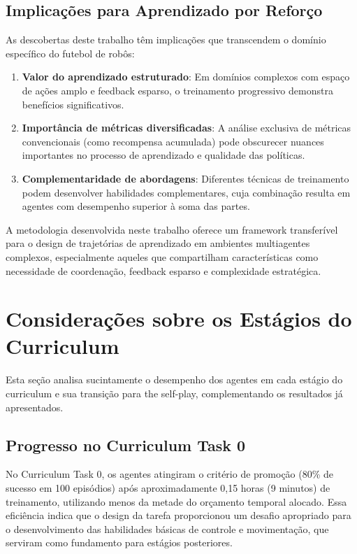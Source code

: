 \subsection{Implicações para Aprendizado por Reforço}

As descobertas deste trabalho têm implicações que transcendem o domínio específico do futebol de robôs:

\begin{enumerate}
    \item \textbf{Valor do aprendizado estruturado}: Em domínios complexos com espaço de ações amplo e feedback esparso, o treinamento progressivo demonstra benefícios significativos.
    
    \item \textbf{Importância de métricas diversificadas}: A análise exclusiva de métricas convencionais (como recompensa acumulada) pode obscurecer nuances importantes no processo de aprendizado e qualidade das políticas.
    
    \item \textbf{Complementaridade de abordagens}: Diferentes técnicas de treinamento podem desenvolver habilidades complementares, cuja combinação resulta em agentes com desempenho superior à soma das partes.
\end{enumerate}

A metodologia desenvolvida neste trabalho oferece um framework transferível para o design de trajetórias de aprendizado em ambientes multiagentes complexos, especialmente aqueles que compartilham características como necessidade de coordenação, feedback esparso e complexidade estratégica.

\section{Considerações sobre os Estágios do Curriculum}
\label{sec:analise_estagios}

Esta seção analisa sucintamente o desempenho dos agentes em cada estágio do curriculum e sua transição para the self-play, complementando os resultados já apresentados.

\subsection{Progresso no Curriculum Task 0}

No Curriculum Task 0, os agentes atingiram o critério de promoção (80\% de sucesso em 100 episódios) após aproximadamente 0,15 horas (9 minutos) de treinamento, utilizando menos da metade do orçamento temporal alocado. Essa eficiência indica que o design da tarefa proporcionou um desafio apropriado para o desenvolvimento das habilidades básicas de controle e movimentação, que serviram como fundamento para estágios posteriores.

